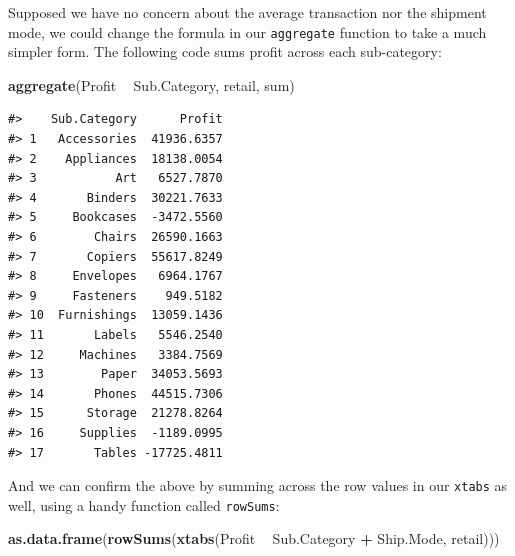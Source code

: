 \documentclass[]{article}
\newenvironment{Shaded}{\begin{snugshade}}{\end{snugshade}}
\newcommand{\KeywordTok}[1]{\textcolor[rgb]{0.13,0.29,0.53}{\textbf{#1}}}
\newcommand{\NormalTok}[1]{#1}
\newcommand{\OperatorTok}[1]{\textcolor[rgb]{0.81,0.36,0.00}{\textbf{#1}}}
\newcommand{\StringTok}[1]{\textcolor[rgb]{0.31,0.60,0.02}{#1}}
\begin{document}
Supposed we have no concern about the average transaction nor the
shipment mode, we could change the formula in our \texttt{aggregate}
function to take a much simpler form. The following code sums profit
across each sub-category:

\begin{Shaded}
\begin{Highlighting}[]
\KeywordTok{aggregate}\NormalTok{(Profit }\OperatorTok{~}\StringTok{ }\NormalTok{Sub.Category, retail, sum)}
\end{Highlighting}
\end{Shaded}

\begin{verbatim}
#>    Sub.Category      Profit
#> 1   Accessories  41936.6357
#> 2    Appliances  18138.0054
#> 3           Art   6527.7870
#> 4       Binders  30221.7633
#> 5     Bookcases  -3472.5560
#> 6        Chairs  26590.1663
#> 7       Copiers  55617.8249
#> 8     Envelopes   6964.1767
#> 9     Fasteners    949.5182
#> 10  Furnishings  13059.1436
#> 11       Labels   5546.2540
#> 12     Machines   3384.7569
#> 13        Paper  34053.5693
#> 14       Phones  44515.7306
#> 15      Storage  21278.8264
#> 16     Supplies  -1189.0995
#> 17       Tables -17725.4811
\end{verbatim}

And we can confirm the above by summing across the row values in our
\texttt{xtabs} as well, using a handy function called \texttt{rowSums}:

\begin{Shaded}
\begin{Highlighting}[]
\KeywordTok{as.data.frame}\NormalTok{(}\KeywordTok{rowSums}\NormalTok{(}\KeywordTok{xtabs}\NormalTok{(Profit }\OperatorTok{~}\StringTok{ }\NormalTok{Sub.Category }\OperatorTok{+}\StringTok{ }\NormalTok{Ship.Mode, retail)))}
\end{Highlighting}
\end{Shaded}
\end{document}

